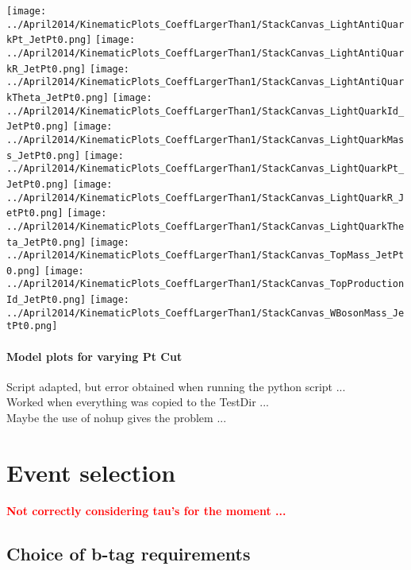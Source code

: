 \documentclass[a4paper,12pt]{report}
\begin{document}
\begin{center}
\texttt{[image: ../April2014/KinematicPlots\_CoeffLargerThan1/StackCanvas\_LightAntiQuarkPt\_JetPt0.png]}
\texttt{[image: ../April2014/KinematicPlots\_CoeffLargerThan1/StackCanvas\_LightAntiQuarkR\_JetPt0.png]}
\texttt{[image: ../April2014/KinematicPlots\_CoeffLargerThan1/StackCanvas\_LightAntiQuarkTheta\_JetPt0.png]}
\texttt{[image: ../April2014/KinematicPlots\_CoeffLargerThan1/StackCanvas\_LightQuarkId\_JetPt0.png]}
\texttt{[image: ../April2014/KinematicPlots\_CoeffLargerThan1/StackCanvas\_LightQuarkMass\_JetPt0.png]}
\texttt{[image: ../April2014/KinematicPlots\_CoeffLargerThan1/StackCanvas\_LightQuarkPt\_JetPt0.png]}
\texttt{[image: ../April2014/KinematicPlots\_CoeffLargerThan1/StackCanvas\_LightQuarkR\_JetPt0.png]}
\texttt{[image: ../April2014/KinematicPlots\_CoeffLargerThan1/StackCanvas\_LightQuarkTheta\_JetPt0.png]}
\texttt{[image: ../April2014/KinematicPlots\_CoeffLargerThan1/StackCanvas\_TopMass\_JetPt0.png]}
\texttt{[image: ../April2014/KinematicPlots\_CoeffLargerThan1/StackCanvas\_TopProductionId\_JetPt0.png]}
\texttt{[image: ../April2014/KinematicPlots\_CoeffLargerThan1/StackCanvas\_WBosonMass\_JetPt0.png]}
\end{center}

\subsubsection{Model plots for varying Pt Cut}
Script adapted, but error obtained when running the python script ...\\
Worked when everything was copied to the TestDir ...\\
Maybe the use of nohup gives the problem ...

\chapter{Event selection}

\textcolor{red}{\textbf{Not correctly considering tau's for the moment ...}}
\section{Choice of b-tag requirements}
\end{document}
